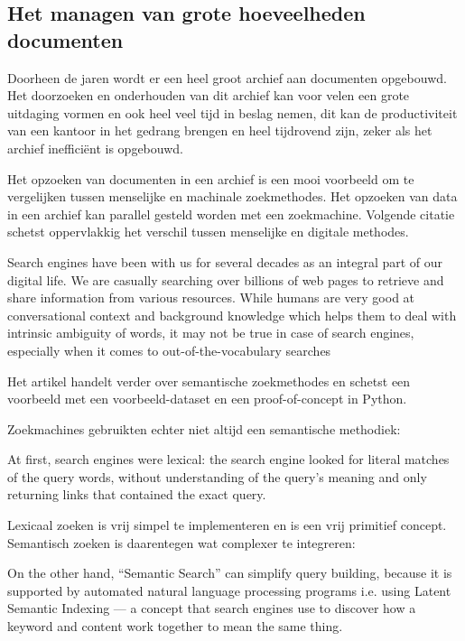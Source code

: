 \subsection{Het managen van grote hoeveelheden documenten}
Doorheen de jaren wordt er een heel groot archief aan documenten opgebouwd.
Het doorzoeken en onderhouden van dit archief kan voor velen een grote uitdaging vormen en ook heel veel tijd in beslag nemen,
dit kan de productiviteit van een kantoor in het gedrang brengen en heel tijdrovend zijn, zeker als het archief inefficiënt is opgebouwd.

Het opzoeken van documenten in een archief is een mooi voorbeeld om te vergelijken tussen menselijke en machinale zoekmethodes.
Het opzoeken van data in een archief kan parallel gesteld worden met een zoekmachine. Volgende citatie schetst oppervlakkig het verschil tussen
menselijke en digitale methodes.

\begin{displayquote}
	Search engines have been with us for several decades as an integral part of our digital life.
	We are casually searching over billions of web pages to retrieve and share information from various resources.
	While humans are very good at conversational context and background knowledge which helps them to deal with intrinsic ambiguity of words,
	it may not be true in case of search engines, especially when it comes to out-of-the-vocabulary searches \autocite{Medium}
\end{displayquote}

Het artikel handelt verder over semantische zoekmethodes en schetst een voorbeeld met een voorbeeld-dataset en een proof-of-concept in Python.

Zoekmachines gebruikten echter niet altijd een semantische methodiek:

\begin{displayquote}
	At first, search engines were lexical: the search engine looked for literal matches of the query words,
	without understanding of the query’s meaning and only returning links that contained the exact query. \autocite{Medium}
\end{displayquote}

Lexicaal zoeken is vrij simpel te implementeren en is een vrij primitief concept. Semantisch zoeken is daarentegen wat complexer te integreren:

\begin{displayquote}
	On the other hand, “Semantic Search” can simplify query building, because it is supported by automated natural language processing programs
	i.e. using Latent Semantic Indexing — a concept that search engines use to discover how a keyword and content work together to mean the same thing. \autocite{Medium}
\end{displayquote}

